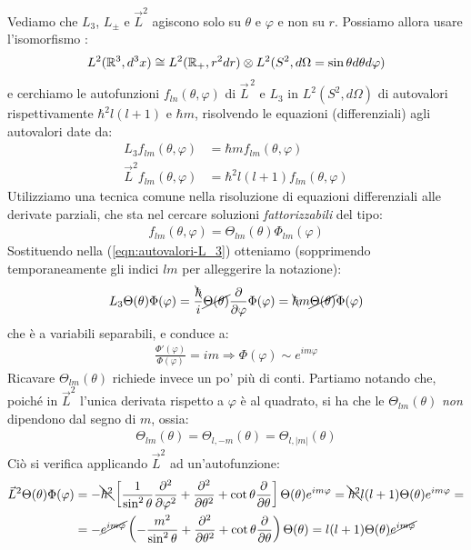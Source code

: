 \documentclass[../../FisicaTeorica.tex]{subfiles}
\begin{document}
Vediamo che $L_3$, $L_\pm$ e $\vec{L}^2$ agiscono solo su $\theta$ e $\varphi$ e non su $r$. Possiamo allora usare l'isomorfismo :
\begin{align*}
L^2(\mathbb{R}^3, d^3x)\cong L^2(\mathbb{R}_+, r^2 dr)\otimes L^2(S^2, d\Omega = \sin\theta d\theta d\varphi)
\end{align*}
e cerchiamo le autofunzioni $f_{ln}(\theta,\varphi)$ di $\vec{L}^{\,2}$ e $L_3$ in $L^2(S^2, d\Omega)$ di autovalori rispettivamente $\hbar^2 l(l+1)$ e $\hbar m$, risolvendo le equazioni (differenziali) agli autovalori date da:
\begin{align}
L_3 f_{lm}(\theta,\varphi) &= \hbar m f_{lm}(\theta,\varphi)\label{eqn:autovalori-L_3}\\
\vec{L}^2 f_{lm}(\theta,\varphi) &= \hbar^2 l(l+1) f_{lm}(\theta,\varphi)\label{eqn:autoalori-Lquadro}
\end{align}
Utilizziamo una tecnica comune nella risoluzione di equazioni differenziali alle derivate parziali, che sta nel cercare soluzioni \textit{fattorizzabili} del tipo:
\begin{align*}
f_{lm}(\theta,\varphi) = \Theta_{lm}(\theta) \Phi_{lm}(\varphi)
\end{align*}
Sostituendo nella (\ref{eqn:autovalori-L_3}) otteniamo (sopprimendo temporaneamente gli indici $lm$ per alleggerire la notazione):
\begin{align*}
L_3 \Theta(\theta)\Phi(\varphi) = \frac{\bcancel{\hbar}}{i}\cancel{\Theta(\theta)}\frac{\partial}{\partial\varphi} \Phi(\varphi)=\bcancel{\hbar} m\cancel{ \Theta(\theta)}\Phi(\varphi)
\end{align*}
che è a variabili separabili, e conduce a:\marginpar{$\Phi(\varphi)$}
\begin{align*}
\frac{\Phi'(\varphi)}{\Phi(\varphi)} = im \Rightarrow \Phi(\varphi) \sim e^{im\varphi}
\end{align*}
Ricavare $\Theta_{lm}(\theta)$ richiede invece un po' più di conti. Partiamo notando che, poiché in $\vec{L}^2$ l'unica derivata rispetto a $\varphi$ è al quadrato, si ha che le $\Theta_{lm}(\theta)$ \textit{non} dipendono dal segno di $m$, ossia:
\begin{align*}
\Theta_{lm}(\theta)=\Theta_{l,-m}(\theta)=\Theta_{l,|m|}(\theta)
\end{align*}
Ciò si verifica applicando $\vec{L}^2$ ad un'autofunzione:
\begin{align*}
\vec{L}^2 \Theta(\theta)\Phi(\varphi) &= -\bcancel{\hbar^2}\left[\frac{1}{\sin^2 \theta}\frac{\partial^2}{\partial \varphi^2} + \frac{\partial^2}{\partial \theta^2} + \cot\theta\frac{\partial}{\partial \theta} \right] \Theta(\theta) e^{im\varphi} =\bcancel{ \hbar^2} l(l+1) \Theta(\theta)e^{im\varphi}=\\
&=-\cancel{e^{im\varphi}}\left(-\frac{m^2}{\sin^2 \theta} +\frac{\partial^2}{\partial \theta^2} + \cot\theta \frac{\partial}{\partial \theta} \right)\Theta(\theta)= l(l+1)\Theta(\theta) \cancel{e^{im\varphi}}
\end{align*}
\end{document}
